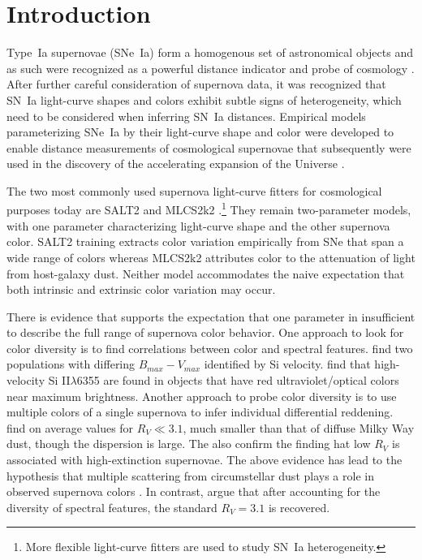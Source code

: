 \documentclass{aastex}   	%
\begin{document}
\section{Introduction}
Type~Ia supernovae (SNe~Ia) form a homogenous set of astronomical objects and as such were recognized as a powerful distance indicator 
and probe of cosmology \citep{1992ARA&A..30..359B}.  After further careful consideration of supernova data, it was recognized
that SN~Ia light-curve shapes \citep{1984SvA....28..658P, 1993ApJ...413L.105P} and colors \citep{1998A&A...331..815T} exhibit subtle signs of heterogeneity,
which need to be considered when inferring SN~Ia distances.  Empirical models parameterizing SNe~Ia by their light-curve shape
and color were developed \citep{1996ApJ...473...88R, 1999ApJ...517..565P} to enable distance measurements of cosmological supernovae
that subsequently were used in the discovery of the accelerating expansion of the Universe \citep{1998AJ....116.1009R,1999ApJ...517..565P}.

The two most commonly used supernova light-curve fitters for cosmological purposes today are SALT2 \citep{2007A&A...466...11G} and MLCS2k2
\citep{2007ApJ...659..122J}.\footnote{More flexible light-curve fitters
\citep[e.g.][]{2011AJ....141...19B} are used to study SN~Ia heterogeneity.}
They remain two-parameter models, with one parameter characterizing light-curve shape and the other
supernova color.  SALT2 training extracts color variation empirically from SNe that span a wide range of colors whereas MLCS2k2
attributes color to the attenuation of light from host-galaxy dust. Neither model accommodates the naive expectation that
both intrinsic and extrinsic color variation may occur.

There is evidence that supports the expectation that one parameter in insufficient to describe the full range
of supernova color behavior.  One approach to look for color diversity is to find correlations between color and spectral features.
\citet{2009ApJ...699L.139W, 2011ApJ...729...55F} find two populations with differing $B_{max}-V_{max}$ identified by Si velocity.
\citet{2015MNRAS.451.1973S}
find that high-velocity Si II$\lambda$6355 are found in objects that have red ultraviolet/optical colors near maximum brightness.
Another approach to probe color diversity is to use multiple colors of a single supernova to infer individual differential reddening. 
\citet{2014ApJ...789...32B, 2015MNRAS.453.3300A} find on average values for $R_V \ll 3.1$,
much smaller than that of diffuse Milky Way dust, though the dispersion is large.
The also confirm the \citet{2011ApJ...729...55F} finding hat low $R_V$ is associated with high-extinction supernovae.
The above evidence has lead to the hypothesis that multiple scattering from circumstellar dust
plays a role in observed supernova colors \citep{2005ApJ...635L..33W, 2008ApJ...686L.103G}.
In contrast, \citet{2011A&A...529L...4C} argue that after accounting for the diversity of spectral features,
the standard $R_V=3.1$ is recovered.
\end{document}
